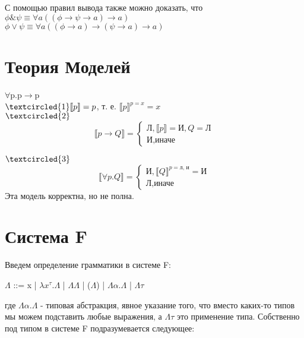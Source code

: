 \documentclass[10pt,a4paper]{article}
\begin{document}
   	\large С помощью правил вывода также можно доказать, что \\
   	$\phi\&\psi\equiv\forall a((\phi\rightarrow\psi\rightarrow a)\rightarrow a)$\\
   	$\phi\vee\psi\equiv\forall a((\phi\rightarrow a)\rightarrow(\psi\rightarrow a)\rightarrow a)$
   
   	\section{Теория Моделей}
   	\textsl{}
   	\large$\forall$p.p$\rightarrow$p\\
   	\large$\textcircled{1} \\
   	  \llbracket p\rrbracket=p$, т. е. $\llbracket p\rrbracket^{p = x} = x$ \\


   	\large\noindent $\textcircled{2}$
   	\begin{equation*}
   		\llbracket p\rightarrow Q\rrbracket = 
   		\begin{cases}
   			\text{Л}, \llbracket p\rrbracket = \text{И}, Q = \text{Л} \\
   			\text{И}, \text{иначе}
   		\end{cases}
   	\end{equation*}
   	
   	\large \noindent $\textcircled{3}$
 	   	\begin{equation*}
 			\llbracket\forall p.Q\rrbracket = 
 			\begin{cases}
 				\text{И}, \llbracket Q\rrbracket^{p=\text{л, и}} = \text{И} \\
 				\text{Л}, \text{иначе}
 			\end{cases}
 		\end{equation*}  
 	Эта модель корректна, но не полна.
 	
	\section{Система F}
	\large Введем определение грамматики в системе F:
	\begin{center}
		\large $\Lambda$ ::= x | $\lambda x^{\tau}.\Lambda$ | $\Lambda\Lambda$ | ($\Lambda$) | $\Lambda\alpha.\Lambda$ | $\Lambda\tau$ 
	\end{center}
	
	где $\Lambda\alpha.\Lambda$ - типовая абстракция, явное указание того, что вместо каких-то типов мы можем подставить любые выражения, а $\Lambda\tau$ это применение типа.
	Собственно под типом в системе F подразумевается следующее:
	
\end{document}
